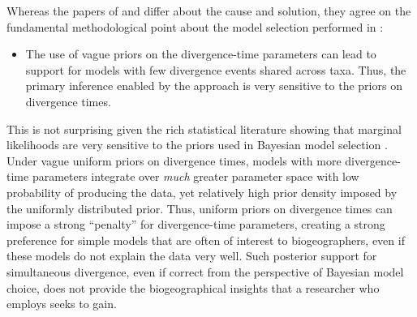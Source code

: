 Whereas the papers of \citet{Oaks2012} and \citet{Hickerson2013} differ about
the cause and solution, they agree on the fundamental methodological point
about the model selection performed in \msb:
\begin{itemize}
   \item The use of vague priors on the divergence-time parameters can lead to
       support for models with few divergence events shared across taxa. Thus,
       the primary inference enabled by the approach is very sensitive to the
       priors on divergence times.
\end{itemize}
This is not surprising given the rich statistical literature showing that
marginal likelihoods are very sensitive to the priors used in Bayesian model
selection
\citep[e.g.,][]{Jeffreys1939,Lindley1957}.
Under vague uniform priors on divergence times, models with more
divergence-time parameters integrate over \emph{much} greater parameter space
with low probability of producing the data, yet relatively high prior density
imposed by the uniformly distributed prior.
Thus, uniform priors on divergence times can impose a strong ``penalty'' for
divergence-time parameters, creating a strong preference for simple
models that are often of interest to biogeographers, even if these models do
not explain the data very well.
Such posterior support for simultaneous divergence, even if correct from the
perspective of Bayesian model choice, does not provide the biogeographical
insights that a researcher who employs \msb seeks to gain.

